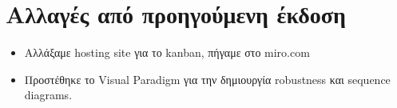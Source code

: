 \section*{Αλλαγές από προηγούμενη έκδοση}
\begin{itemize}
    \item Αλλάξαμε hosting site για το kanban, πήγαμε στο miro.com
    \item Προστέθηκε το Visual Paradigm για την δημιουργία robustness και sequence diagrams.
\end{itemize}
\clearpage